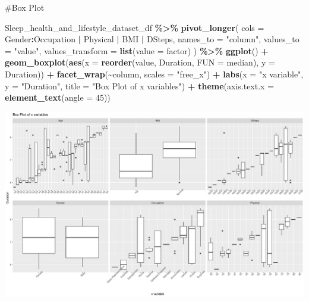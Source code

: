\documentclass[
  11pt,
]{article}
\newenvironment{Shaded}{\begin{snugshade}}{\end{snugshade}}
\newcommand{\AttributeTok}[1]{\textcolor[rgb]{0.13,0.29,0.53}{#1}}
\newcommand{\DecValTok}[1]{\textcolor[rgb]{0.00,0.00,0.81}{#1}}
\newcommand{\FunctionTok}[1]{\textcolor[rgb]{0.13,0.29,0.53}{\textbf{#1}}}
\newcommand{\NormalTok}[1]{#1}
\newcommand{\SpecialCharTok}[1]{\textcolor[rgb]{0.81,0.36,0.00}{\textbf{#1}}}
\newcommand{\StringTok}[1]{\textcolor[rgb]{0.31,0.60,0.02}{#1}}
\begin{document}
\#Box Plot

\begin{Shaded}
\begin{Highlighting}[]
\NormalTok{Sleep\_health\_and\_lifestyle\_dataset\_df }\SpecialCharTok{\%\textgreater{}\%}
  \FunctionTok{pivot\_longer}\NormalTok{(}
    \AttributeTok{cols =}\NormalTok{ Gender}\SpecialCharTok{:}\NormalTok{Occupation }\SpecialCharTok{|}\NormalTok{ Physical }\SpecialCharTok{|}\NormalTok{ BMI }\SpecialCharTok{|}\NormalTok{ DSteps,}
    \AttributeTok{names\_to =} \StringTok{"column"}\NormalTok{,}
    \AttributeTok{values\_to =} \StringTok{"value"}\NormalTok{,}
    \AttributeTok{values\_transform =} \FunctionTok{list}\NormalTok{(}\AttributeTok{value =} \StringTok{\textquotesingle{}factor\textquotesingle{}}\NormalTok{)}
\NormalTok{) }\SpecialCharTok{\%\textgreater{}\%}
\FunctionTok{ggplot}\NormalTok{() }\SpecialCharTok{+}
  \FunctionTok{geom\_boxplot}\NormalTok{(}\FunctionTok{aes}\NormalTok{(}\AttributeTok{x =} \FunctionTok{reorder}\NormalTok{(value, Duration, }\AttributeTok{FUN =}\NormalTok{ median), }\AttributeTok{y =}\NormalTok{ Duration)) }\SpecialCharTok{+}
  \FunctionTok{facet\_wrap}\NormalTok{(}\SpecialCharTok{\textasciitilde{}}\NormalTok{column, }\AttributeTok{scales =} \StringTok{"free\_x"}\NormalTok{) }\SpecialCharTok{+}
  \FunctionTok{labs}\NormalTok{(}\AttributeTok{x =} \StringTok{"x variable"}\NormalTok{, }\AttributeTok{y =} \StringTok{"Duration"}\NormalTok{, }\AttributeTok{title =} \StringTok{"Box Plot of x variables"}\NormalTok{) }\SpecialCharTok{+}
  \FunctionTok{theme}\NormalTok{(}\AttributeTok{axis.text.x =} \FunctionTok{element\_text}\NormalTok{(}\AttributeTok{angle =} \DecValTok{45}\NormalTok{))}
\end{Highlighting}
\end{Shaded}

\begin{center}\includegraphics[width=0.7\linewidth]{SleepHelath_files/figure-latex/unnamed-chunk-62-1} \end{center}
\end{document}
